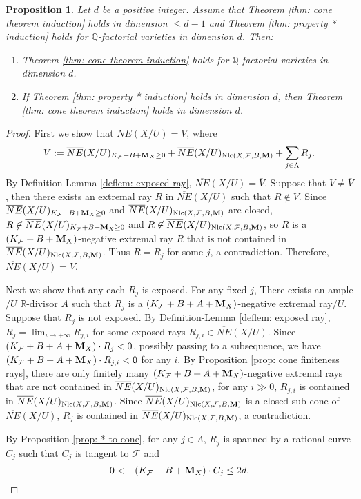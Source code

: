 \documentclass[11pt]{amsart}
\numberwithin{equation}{section}
\newcommand{\Mm}{{\bf{M}}}
\newcommand{\Qq}{\mathbb{Q}}
\newcommand{\Rr}{\mathbb{R}}
\newcommand{\Nlc}{\operatorname{Nlc}}
\newcommand{\Ff}{\mathcal{F}}
\newtheorem{prop}[thm]{Proposition}
\theoremstyle{definition}
\theoremstyle{definition}
\theoremstyle{definition}
\begin{document}
\begin{prop}\label{prop: * to cone final part}
    Let $d$ be a positive integer. Assume that Theorem \ref{thm: cone theorem induction} holds in dimension $\leq d-1$ and Theorem \ref{thm: property * induction} holds for $\Qq$-factorial varieties in dimension $d$. Then:
    \begin{enumerate}
    \item Theorem \ref{thm: cone theorem induction} holds for $\Qq$-factorial varieties in dimension $d$.
    \item If Theorem \ref{thm: property * induction} holds in dimension $d$, then Theorem \ref{thm: cone theorem induction} holds in dimension $d$.
    \end{enumerate}
\end{prop}
\begin{proof}
First we show that $\overline{NE}(X/U)=V$, where
$$V:=\overline{NE}(X/U)_{K_{\Ff}+B+\Mm_X\geq 0}+\overline{NE}(X/U)_{\Nlc(X,\Ff,B,\Mm)}+\sum_{j\in\Lambda}R_j.$$
By Definition-Lemma \ref{deflem: exposed ray}, $\overline{NE}(X/U)=\overline{V}$. Suppose that $V\not=\overline{V}$, then there exists an extremal ray $R$ in $\overline{NE}(X/U)$ such that $R\not\in V$. Since $\overline{NE}(X/U)_{K_{\Ff}+B+\Mm_X\geq 0}$ and $\overline{NE}(X/U)_{\Nlc(X,\Ff,B,\Mm)}$ are closed, $R\not\in \overline{NE}(X/U)_{K_{\Ff}+B+\Mm_X\geq 0}$ and $R\not\in \overline{NE}(X/U)_{\Nlc(X,\Ff,B,\Mm)}$, so $R$ is a $(K_{\Ff}+B+\Mm_X)$-negative extremal ray $R$ that is not contained in $\overline{NE}(X/U)_{\Nlc(X,\Ff,B,\Mm)}$. Thus $R=R_j$ for some $j$, a contradiction. Therefore, $\overline{NE}(X/U)=V$.

Next we show that any each $R_j$ is exposed. For any fixed $j$, There exists an ample$/U$ $\Rr$-divisor $A$ such that $R_j$ is a $(K_{\Ff}+B+A+\Mm_X)$-negative extremal ray$/U$. Suppose that $R_j$ is not exposed. By Definition-Lemma \ref{deflem: exposed ray}, $R_j=\lim_{i\rightarrow+\infty}R_{j,i}$ for some exposed rays $R_{j,i}\in\overline{NE}(X/U)$. Since $(K_{\Ff}+B+A+\Mm_X)\cdot R_j<0$, possibly passing to a subsequence, we have $(K_{\Ff}+B+A+\Mm_X)\cdot R_{j,i}<0$ for any $i$.  By Proposition \ref{prop: cone finiteness rays}, there are only finitely many $(K_{\Ff}+B+A+\Mm_X)$-negative extremal rays that are not contained in $\overline{NE}(X/U)_{\Nlc(X,\Ff,B,\Mm)}$, for any $i\gg 0$, $R_{j,i}$ is contained in $\overline{NE}(X/U)_{\Nlc(X,\Ff,B,\Mm)}$. Since $\overline{NE}(X/U)_{\Nlc(X,\Ff,B,\Mm)}$ is a closed sub-cone of $\overline{NE}(X/U)$, $R_j$ is contained in $\overline{NE}(X/U)_{\Nlc(X,\Ff,B,\Mm)}$, a contradiction.

By Proposition \ref{prop: * to cone}, for any $j\in\Lambda$, $R_j$ is spanned by a rational curve $C_j$ such that $C_j$ is tangent to $\Ff$ and
$$0<-(K_{\Ff}+B+\Mm_X)\cdot C_j\leq 2d.$$
\end{proof}
\end{document}
